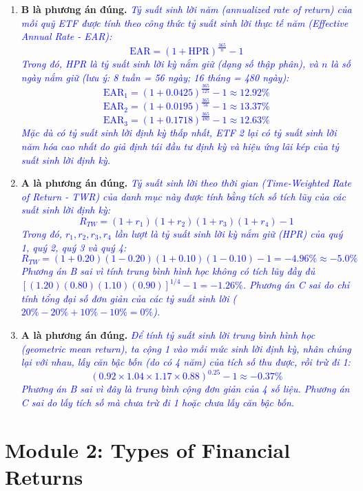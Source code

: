 \begin{enumerate}
	\item \textbf{B là phương án đúng.} \textcolor{blue}{\textit{Tỷ suất sinh lời năm (annualized rate of return) của mỗi quỹ ETF được tính theo công thức tỷ suất sinh lời thực tế năm (Effective Annual Rate - EAR):
	      \[
	      \text{EAR} = (1 + \text{HPR})^{\frac{365}{n}} - 1
	      \]
	      Trong đó, HPR là tỷ suất sinh lời kỳ nắm giữ (dạng số thập phân), và $n$ là số ngày nắm giữ (lưu ý: 8 tuần = 56 ngày; 16 tháng = 480 ngày):
	      \[
	      \text{EAR}_1 = (1 + 0.0425)^{\frac{365}{125}} - 1 \approx 12.92\%
	      \]
	      \[
	      \text{EAR}_2 = (1 + 0.0195)^{\frac{365}{56}} - 1 \approx 13.37\%
	      \]
	      \[
	      \text{EAR}_3 = (1 + 0.1718)^{\frac{365}{480}} - 1 \approx 12.63\%
	      \]
	      Mặc dù có tỷ suất sinh lời định kỳ thấp nhất, ETF 2 lại có tỷ suất sinh lời năm hóa cao nhất do giả định tái đầu tư định kỳ và hiệu ứng lãi kép của tỷ suất sinh lời định kỳ.}}

	\item \textbf{A là phương án đúng.} \textcolor{blue}{\textit{Tỷ suất sinh lời theo thời gian (Time-Weighted Rate of Return - TWR) của danh mục này được tính bằng tích số tích lũy của các suất sinh lời định kỳ:
	      \[
	      R_{TW} = (1 + r_1)(1 + r_2)(1 + r_3)(1 + r_4) - 1
	      \]
	      Trong đó, $r_1, r_2, r_3, r_4$ lần lượt là tỷ suất sinh lời kỳ nắm giữ (HPR) của quý 1, quý 2, quý 3 và quý 4:
	      \[
	      R_{TW} = (1 + 0.20)(1 - 0.20)(1 + 0.10)(1 - 0.10) - 1 = -4.96\% \approx -5.0\%
	      \]
	      Phương án B sai vì tính trung bình hình học không có tích lũy đầy đủ $[(1.20)(0.80)(1.10)(0.90)]^{1/4} - 1 = -1.26\%$. Phương án C sai do chỉ tính tổng đại số đơn giản của các tỷ suất sinh lời ($20\% - 20\% + 10\% - 10\% = 0\%$).}}

	\item \textbf{A là phương án đúng.} \textcolor{blue}{\textit{Để tính tỷ suất sinh lời trung bình hình học (geometric mean return), ta cộng 1 vào mỗi mức sinh lời định kỳ, nhân chúng lại với nhau, lấy căn bậc bốn (do có 4 năm) của tích số thu được, rồi trừ đi 1:
	      \[
	      (0.92 \times 1.04 \times 1.17 \times 0.88)^{0.25} - 1 \approx -0.37\%
	      \]
	      Phương án B sai vì đây là trung bình cộng đơn giản của 4 số liệu. Phương án C sai do lấy tích số mà chưa trừ đi 1 hoặc chưa lấy căn bậc bốn.}}
\end{enumerate}

\newpage

\section{Module 2: Types of Financial Returns}
\label{sec:app_Problems_M2}

